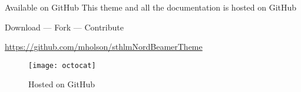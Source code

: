 \documentclass[\string~/GitHub/sthlmNordBeamerTheme/sthlmNordLightDemo.tex]{subfiles}
\begin{document}
\begin{frame}[c]{Available on GitHub}
	This theme and all the documentation is hosted on GitHub \\
	\vspace{1em}
	\begin{center}
		\large{Download --- Fork --- Contribute}

		\url{https://github.com/mholson/sthlmNordBeamerTheme}
		\vspace{1em}

		\begin{figure}
			\centerline{\texttt{[image: octocat]}}
			\caption{Hosted on GitHub}
		\end{figure}

	\end{center}
\end{frame}
\end{document}
